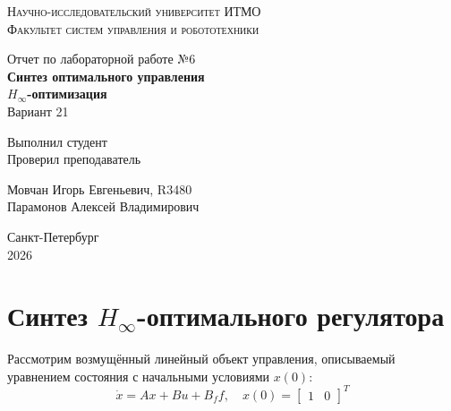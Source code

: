 \documentclass[a4paper,hidelinks,14pt]{extarticle}
\begin{document}
	\begin{titlepage}
		\setlength{\parindent}{0ex}
		
		\begin{center}
			\textsc{
				\vspace{1ex}
                Научно-исследовательский университет ИТМО \\
				\vspace{0.5ex}
				Факультет систем управления и робототехники \\
				\vspace{0.5ex}
			}
		\end{center}
		
		\vspace{45mm}
		
		\begin{center}
			Отчет по лабораторной работе №6\\
			\textbf{Синтез оптимального управления \\
			$H_\infty$-оптимизация} \\[0.5ex]
			Вариант 21
		\end{center}
		
		\vspace{50mm}
		
		\begin{minipage}{.45\linewidth}
			Выполнил студент
            \\
			Проверил преподаватель
		\end{minipage}
		\hfill
		\begin{minipage}{.52\linewidth}
			\begin{flushright}
				Мовчан Игорь Евгеньевич, R3480
                \\
				Парамонов Алексей Владимирович
			\end{flushright}
		\end{minipage}
		
		\vfill
		\begin{center}
			Санкт-Петербург
			\\
			2026
		\end{center}
		
	\end{titlepage}

	\tableofcontents
	\clearpage
	
	\section{Синтез $H_\infty$-оптимального регулятора}
	Рассмотрим возмущённый линейный объект управления, описываемый уравнением состояния с начальными условиями $x(0)$:
	\[
		\dot{x} = Ax + Bu + B_f f, \quad x(0) = \begin{bmatrix}
			1 & 0
		\end{bmatrix}^T
	\]
\end{document}
